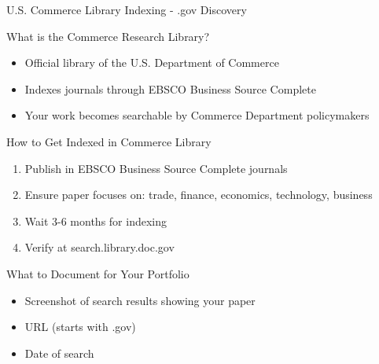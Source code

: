 \documentclass[11pt]{beamer}
\begin{document}
				\begin{frame}{U.S. Commerce Library Indexing - .gov Discovery}
					\scriptsize
					\begin{block}{What is the Commerce Research Library?}
						\begin{itemize}
							\item Official library of the U.S. Department of Commerce
							\item Indexes journals through EBSCO Business Source Complete
							\item Your work becomes searchable by Commerce Department policymakers
						\end{itemize}
					\end{block}
					\begin{block}{How to Get Indexed in Commerce Library}
						\begin{enumerate}
							\item Publish in EBSCO Business Source Complete journals
							\item Ensure paper focuses on: trade, finance, economics, technology, business
							\item Wait 3-6 months for indexing
							\item Verify at search.library.doc.gov
						\end{enumerate}
					\end{block}
					\begin{block}{What to Document for Your Portfolio}
						\begin{itemize}
							\item Screenshot of search results showing your paper
							\item URL (starts with .gov)
							\item Date of search
						\end{itemize}
					\end{block}
				\end{frame}
				
\end{document}
